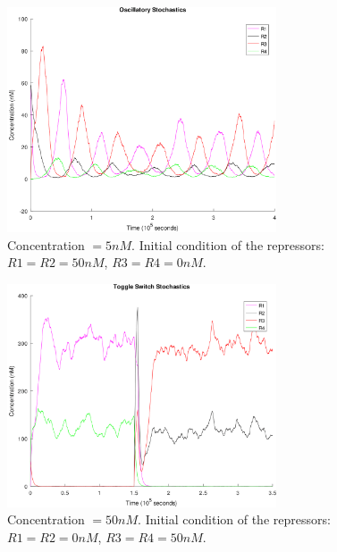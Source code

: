     \begin{figure}[!htbp]
      \centering
      \includegraphics[width=0.71\textwidth]{img/stochastic-oscillator-1.png}
      \caption{Concentration $= 5nM$. Initial condition of the repressors: $R1 = R2 = 50nM$, $R3 = R4 = 0nM$.}
      \label{fig.stochastic-oscillator}
    \end{figure}

    \begin{figure}[!htbp]
      \centering
      \includegraphics[width=0.71\textwidth]{img/stochastic-switch-4-1.png}
      \caption{Concentration $= 50nM$. Initial condition of the repressors: $R1 = R2 = 0nM$, $R3 = R4 = 50nM$.}
      \label{fig.stochastic-switch-4}
    \end{figure}

